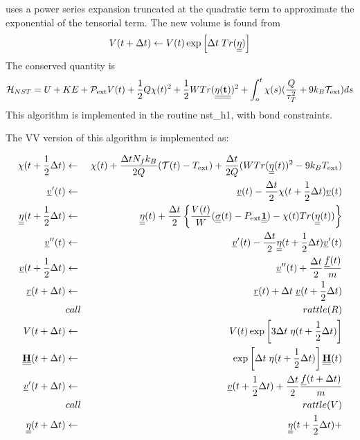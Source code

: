 \D{} uses a power series expansion truncated at the quadratic term to 
approximate the exponential of the tensorial term. The new volume is
found from
\begin{equation}
V(t+\Delta t) \leftarrow V(t) \exp\left[ \Delta t\; Tr(\mbox{$\underline{\underline{\bf \eta}}$})\right]
\end{equation}
The conserved quantity is
\begin{equation}
{\cal H}_{NST} = U + KE + {\cal P}_{\rm ext} V(t) +  {1\over 2}Q \chi(t)^2 +
{1\over 2}W Tr(\mbox{$\underline{\underline{\bf \eta(t)}}$})^2 + \int_o^t \chi(s)({Q \over \tau_T^2}+9k_B{\cal
T}_{\rm ext})ds
\end{equation}
This algorithm is implemented in the routine {\sc nst\_h1}, with bond
constraints.

The VV version of this algorithm is implemented as:

\begin{eqnarray}
\chi(t+{1\over 2}\Delta t) &\leftarrow& \chi(t) + {\Delta t N_fk_B  \over
2 Q} ( {\cal T}(t) - T_{\rm ext}) + {\Delta t\over
2Q}(WTr(\mat{\eta}(t))^2-9k_B T_{\rm ext})\nonumber\\
\vek{v}'(t)&\leftarrow& \vek{v}(t) -
 {\Delta t \over 2}\chi(t+{1\over 2}\Delta t)\vek{v}(t)\nonumber\\
\mat{\eta}(t+{1\over 2}\Delta t) &\leftarrow& \mat{\eta}(t) + 
{\Delta t \over 2}\left \{{ V(t) \over W} 
( \mat{\sigma}(t) - P_{\rm ext}\mat{1})-\chi(t)Tr(\mat{\eta}(t))\right \}
 \nonumber\\
\vek{v}''(t)&\leftarrow& \vek{v}'(t) - {\Delta t \over
2}\mat{\eta}(t+{1\over 2}\Delta t)\vek{v}'(t)\nonumber\\
\vek{v}(t + {1\over 2} \Delta t)&\leftarrow& \vek{v}''(t)
+ {\Delta t \over 2} {\vek{f}(t)\over m} \nonumber \\
\vek{r}(t+\Delta t) &\leftarrow& \vek{r}(t) + \Delta t \;
\vek{v}(t+{1\over 2}\Delta t)\nonumber \\
&call&rattle(R) \nonumber \\
V(t+\Delta t)& \leftarrow& V(t) \exp\left[3\Delta t\; \eta(t+{1\over 2}\Delta t)\right]\nonumber\\
\mat{H}(t+\Delta t) &\leftarrow& \exp\left[\Delta t
\;\eta(t+{1\over 2}\Delta t)\right]\mat{H}(t)\nonumber \\
\vek{v}'(t + \Delta t)&\leftarrow& \vek{v}(t + {1 \over 2}\Delta t) +
 {\Delta t \over 2} {\vek{f}(t + \Delta t)\over m} \nonumber \\
&call&rattle(V) \nonumber \\
\mat{\eta}(t+\Delta t) &\leftarrow& \mat{\eta}(t+{1\over 2}\Delta t) + 

\end{eqnarray}
